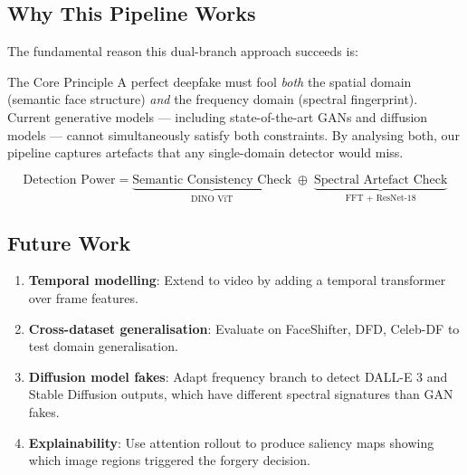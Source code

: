 \documentclass[12pt,a4paper]{article}
\begin{document}
\subsection{Why This Pipeline Works}

The fundamental reason this dual-branch approach succeeds is:

\begin{insightbox}{The Core Principle}
A perfect deepfake must fool \textit{both} the spatial domain (semantic face structure)
\textit{and} the frequency domain (spectral fingerprint). Current generative models ---
including state-of-the-art GANs and diffusion models --- cannot simultaneously satisfy
both constraints. By analysing both, our pipeline captures artefacts that any single-domain
detector would miss.

\begin{equation*}
  \text{Detection Power} = \underbrace{\text{Semantic Consistency Check}}_{\text{DINO ViT}}
  \;\oplus\; \underbrace{\text{Spectral Artefact Check}}_{\text{FFT + ResNet-18}}
\end{equation*}
\end{insightbox}

\subsection{Future Work}

\begin{enumerate}[leftmargin=1.5em]
  \item \textbf{Temporal modelling}: Extend to video by adding a temporal transformer over
    frame features.
  \item \textbf{Cross-dataset generalisation}: Evaluate on FaceShifter, DFD, Celeb-DF to
    test domain generalisation.
  \item \textbf{Diffusion model fakes}: Adapt frequency branch to detect DALL-E 3 and
    Stable Diffusion outputs, which have different spectral signatures than GAN fakes.
  \item \textbf{Explainability}: Use attention rollout to produce saliency maps showing
    which image regions triggered the forgery decision.
\end{enumerate}
\end{document}
